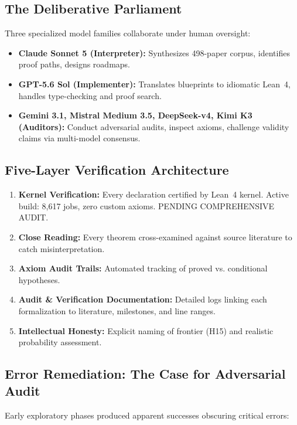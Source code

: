 \documentclass[11pt,a4paper]{article}
\theoremstyle{plain}
\theoremstyle{definition}
\theoremstyle{remark}
\begin{document}
\subsection{The Deliberative Parliament}

Three specialized model families collaborate under human oversight:

\begin{itemize}[leftmargin=2em]
  \item \textbf{Claude Sonnet 5 (Interpreter):} Synthesizes 498-paper corpus, identifies proof paths, designs roadmaps.
  \item \textbf{GPT-5.6 Sol (Implementer):} Translates blueprints to idiomatic Lean~4, handles type-checking and proof search.
  \item \textbf{Gemini 3.1, Mistral Medium 3.5, DeepSeek-v4, Kimi K3 (Auditors):} Conduct adversarial audits, inspect axioms, challenge validity claims via multi-model consensus.
\end{itemize}

\subsection{Five-Layer Verification Architecture}

\begin{enumerate}[leftmargin=2em]
  \item \textbf{Kernel Verification:} Every declaration certified by Lean~4 kernel. Active build: 8,617 jobs, zero custom axioms. PENDING COMPREHENSIVE AUDIT.
  \item \textbf{Close Reading:} Every theorem cross-examined against source literature to catch misinterpretation.
  \item \textbf{Axiom Audit Trails:} Automated tracking of proved vs. conditional hypotheses.
  \item \textbf{Audit & Verification Documentation:} Detailed logs linking each formalization to literature, milestones, and line ranges.
  \item \textbf{Intellectual Honesty:} Explicit naming of frontier (H15) and realistic probability assessment.
\end{enumerate}

\subsection{Error Remediation: The Case for Adversarial Audit}

Early exploratory phases produced apparent successes obscuring critical errors:
\end{document}
